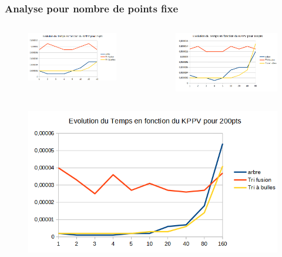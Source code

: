 \documentclass{beamer}
\begin{document}
\begin{frame}
\frametitle{Analyse pour nombre de points fixe}
\begin{columns}
    \begin{figure}
      \includegraphics[width=\textwidth]{Beamer/K_75_M2.png}
    \end{figure}

    \begin{figure}
      \includegraphics[width=\textwidth]{Beamer/K_100_M2.png}
    \end{figure}
\end{columns}

  \begin{columns}
    \begin{figure}
      \includegraphics[width=\textwidth]{Beamer/K_200_M2.png}
    \end{figure}


\end{columns}
\end{frame}
\end{document}
